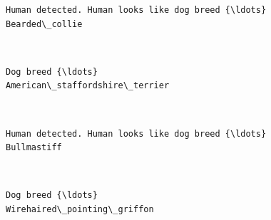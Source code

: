 \documentclass[11pt]{article}
\begin{document}
    \begin{Verbatim}[commandchars=\\\{\}]
Human detected. Human looks like dog breed {\ldots}
Bearded\_collie

    \end{Verbatim}

    \begin{center}
    \end{center}
    { \hspace*{\fill} \\}
    
    \begin{Verbatim}[commandchars=\\\{\}]
Dog breed {\ldots}
American\_staffordshire\_terrier

    \end{Verbatim}

    \begin{center}
    \end{center}
    { \hspace*{\fill} \\}
    
    \begin{Verbatim}[commandchars=\\\{\}]
Human detected. Human looks like dog breed {\ldots}
Bullmastiff

    \end{Verbatim}

    \begin{center}
    \end{center}
    { \hspace*{\fill} \\}
    
    \begin{Verbatim}[commandchars=\\\{\}]
Dog breed {\ldots}
Wirehaired\_pointing\_griffon

    \end{Verbatim}

    \begin{center}
    \end{center}
    { \hspace*{\fill} \\}
    
\end{document}

